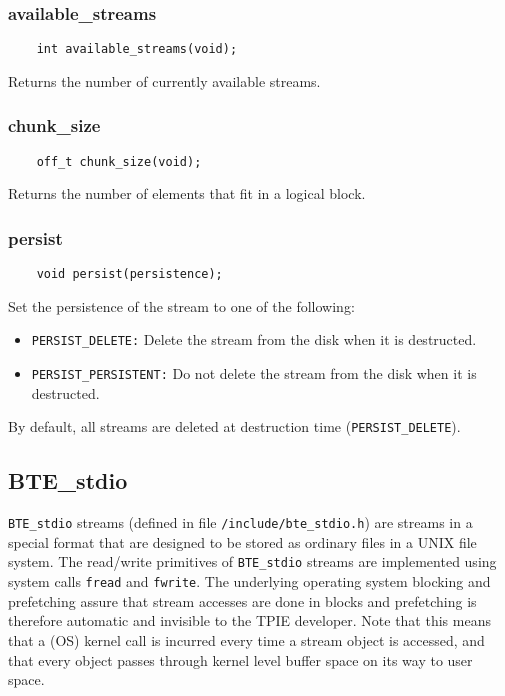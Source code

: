     
\subsubsection{available\_streams}
\begin{verbatim}
    int available_streams(void);    
\end{verbatim}
Returns the number of currently available streams.

\subsubsection{chunk\_size}
\begin{verbatim}
    off_t chunk_size(void);
\end{verbatim}
Returns the number of elements that fit in a logical block.

\subsubsection{persist}
\begin{verbatim}
    void persist(persistence);
\end{verbatim}
Set the persistence of the stream to one of the following:
\begin{itemize}
\item \verb|PERSIST_DELETE:| Delete the stream from the disk when it is
  destructed.
\item \verb|PERSIST_PERSISTENT:| Do not delete the stream from the disk when
  it is destructed.
\end{itemize}

By default, all streams are deleted at destruction time
(\verb|PERSIST_DELETE|).

\subsection{BTE\_stdio}

\tobeextended

\verb|BTE_stdio| streams (defined in file \verb|/include/bte_stdio.h|) are
streams in a special format that are designed to be stored as ordinary
files in a UNIX file system. The read/write primitives of \verb|BTE_stdio|
streams are implemented using system calls \verb|fread| and
\verb|fwrite|. The underlying operating system blocking and prefetching
assure that stream accesses are done in blocks and prefetching is therefore
automatic and invisible to the TPIE developer. Note that this means that a
(OS) kernel call is incurred every time a stream object is
accessed, and that every object passes through kernel level buffer space on
its way to user space.

